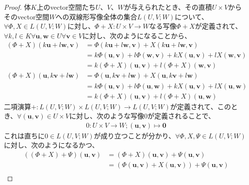 \documentclass[dvipdfmx]{jsarticle}
\begin{document}
\begin{proof}
体$K$上のvector空間たち$U$、$V$、$W$が与えられたとき、その直積$U \times V$からそのvector空間$W$への双線形写像全体の集合$L(U,V;W)$について、$\forall\varPhi,X \in L(U,V;W)$に対し、$\varPhi + X:U \times V \rightarrow W$なる写像$\varPhi + X$が定義されて、$\forall k,l \in K\forall\mathbf{u},\mathbf{w} \in U\forall\mathbf{v} \in V$に対し、次のようになることから、
\begin{align*}
(\varPhi + X)\left( k\mathbf{u} + l\mathbf{w},\mathbf{v} \right) &= \varPhi\left( k\mathbf{u} + l\mathbf{w},\mathbf{v} \right) + X\left( k\mathbf{u} + l\mathbf{w},\mathbf{v} \right)\\
&= k\varPhi\left( \mathbf{u},\mathbf{v} \right) + l\varPhi\left( \mathbf{w},\mathbf{v} \right) + kX\left( \mathbf{u},\mathbf{v} \right) + lX\left( \mathbf{w},\mathbf{v} \right)\\
&= k(\varPhi + X)\left( \mathbf{u},\mathbf{v} \right) + l(\varPhi + X)\left( \mathbf{w},\mathbf{v} \right)\\
(\varPhi + X)\left( \mathbf{u},k\mathbf{v} + l\mathbf{w} \right) &= \varPhi\left( \mathbf{u},k\mathbf{v} + l\mathbf{w} \right) + X\left( \mathbf{u},k\mathbf{v} + l\mathbf{w} \right)\\
&= k\varPhi\left( \mathbf{u},\mathbf{v} \right) + l\varPhi\left( \mathbf{u},\mathbf{w} \right) + kX\left( \mathbf{u},\mathbf{v} \right) + lX\left( \mathbf{u},\mathbf{w} \right)\\
&= k(\varPhi + X)\left( \mathbf{u},\mathbf{v} \right) + l(\varPhi + X)\left( \mathbf{u},\mathbf{w} \right)
\end{align*}
二項演算$+ :L(U,V;W) \times L(U,V;W) \rightarrow L(U,V;W)$が定義されて、このとき、$\forall\left( \mathbf{u},\mathbf{v} \right) \in U \times V$に対し、次のような写像$0$が定義されることで、
\begin{align*}
0:U \times V \rightarrow W;\left( \mathbf{u},\mathbf{v} \right) \mapsto \mathbf{0}
\end{align*}
これは直ちに$0 \in L(U,V;W)$が成り立つことが分かり、$\forall\varPhi,X,\varPsi \in L(U,V;W)$に対し、次のようになるかつ、
\begin{align*}
\left( (\varPhi + X) + \varPsi \right)\left( \mathbf{u},\mathbf{v} \right) &= (\varPhi + X)\left( \mathbf{u},\mathbf{v} \right) + \varPsi\left( \mathbf{u},\mathbf{v} \right)\\
&= \left( \varPhi\left( \mathbf{u},\mathbf{v} \right) + X\left( \mathbf{u},\mathbf{v} \right) \right) + \varPsi\left( \mathbf{u},\mathbf{v} \right)\\

\end{align*}
\end{proof}
\end{document}
